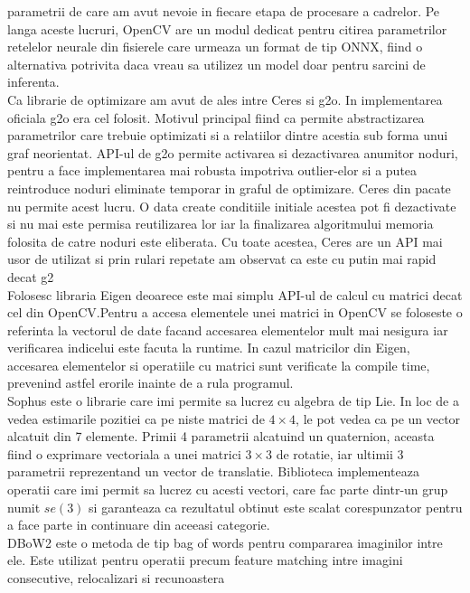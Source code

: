 \documentclass[12pt,a4paper]{report}
\begin{document}
parametrii de care am avut nevoie in fiecare etapa de procesare a cadrelor. Pe langa aceste 
lucruri, OpenCV are un modul dedicat pentru citirea parametrilor retelelor neurale din fisierele care 
urmeaza un format de tip ONNX, fiind o alternativa potrivita daca vreau sa utilizez un model doar 
pentru sarcini de inferenta.  \\
Ca librarie de optimizare am avut de ales intre Ceres si g2o. In implementarea oficiala 
g2o era cel folosit. Motivul principal fiind ca permite abstractizarea parametrilor care 
trebuie optimizati si a relatiilor dintre acestia sub forma unui graf neorientat. 
API-ul de g2o permite activarea si dezactivarea anumitor noduri, pentru a face implementarea 
mai robusta impotriva outlier-elor si a putea reintroduce noduri eliminate temporar in graful 
de optimizare. Ceres din pacate nu permite acest lucru. O data create conditiile initiale acestea 
pot fi dezactivate si nu mai este permisa reutilizarea lor iar la finalizarea algoritmului 
memoria folosita de catre noduri este eliberata. Cu toate acestea, Ceres are un API mai
usor de utilizat si prin rulari repetate am observat ca este cu putin mai rapid decat g2 \\
Folosesc libraria Eigen deoarece este mai simplu API-ul de calcul cu matrici decat 
cel din OpenCV.\@ Pentru a accesa elementele unei matrici in OpenCV se foloseste o referinta la 
vectorul de date facand accesarea elementelor mult mai nesigura iar verificarea indicelui este 
facuta la runtime. In cazul matricilor din Eigen, accesarea elementelor si operatiile
cu matrici sunt verificate la compile time, prevenind astfel erorile inainte de a rula programul. \\
Sophus este o librarie care imi permite sa lucrez cu algebra de tip Lie. In loc de a vedea
estimarile pozitiei ca pe niste matrici de $ 4 \times 4 $, le pot vedea ca pe un vector alcatuit din 7 
elemente. Primii 4 parametrii alcatuind un quaternion, aceasta fiind o exprimare vectoriala 
a unei matrici $ 3 \times 3 $ de rotatie, iar ultimii 3 parametrii reprezentand un vector de translatie.
Biblioteca implementeaza operatii care imi permit sa lucrez cu acesti vectori, care fac parte 
dintr-un grup numit \(se(3)\) si garanteaza ca rezultatul obtinut este scalat corespunzator 
pentru a face parte in continuare din aceeasi categorie. \\
DBoW2 este o metoda de tip bag of words pentru compararea imaginilor intre ele. Este utilizat
pentru operatii precum feature matching intre imagini consecutive, relocalizari si recunoastera
\end{document}
